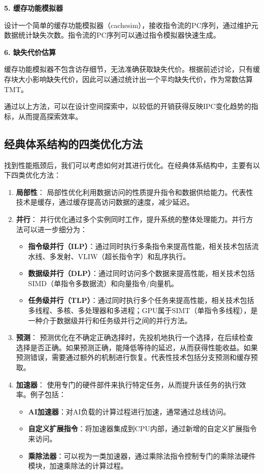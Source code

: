 \textbf{5. 缓存功能模拟器}

设计一个简单的缓存功能模拟器（cachesim），接收指令流的PC序列，通过维护元数据统计缺失次数。指令流的PC序列可以通过指令模拟器快速生成。

\textbf{6. 缺失代价估算}

缓存功能模拟器不包含访存细节，无法准确获取缺失代价。根据前述讨论，只有缓存块大小影响缺失代价，因此可以通过统计出一个平均缺失代价，作为常数估算TMT。

通过以上方法，可以在设计空间探索中，以较低的开销获得反映IPC变化趋势的指标，从而提高探索效率。

\subsection{经典体系结构的四类优化方法}\label{sec:09-cache-031}

找到性能瓶颈后，我们可以考虑如何对其进行优化。在经典体系结构中，主要有以下四类优化方法：

\begin{enumerate}
\def\labelenumi{\arabic{enumi}.}
\tightlist
\item
  \textbf{局部性}： 局部性优化利用数据访问的性质提升指令和数据供给能力。代表性技术是缓存，通过缓存提高访问数据的速度，减少延迟。
\item
  \textbf{并行}： 并行优化通过多个实例同时工作，提升系统的整体处理能力。并行方法可以进一步细分为：

  \begin{itemize}
  \tightlist
  \item
    \textbf{指令级并行（ILP）}：通过同时执行多条指令来提高性能，相关技术包括流水线、多发射、VLIW（超长指令字）和乱序执行。
  \item
    \textbf{数据级并行（DLP）}：通过同时访问多个数据来提高性能，相关技术包括SIMD（单指令多数据流）和向量指令/向量机。
  \item
    \textbf{任务级并行（TLP）}：通过同时执行多个任务来提高性能，相关技术包括多线程、多核、多处理器和多进程；GPU属于SIMT（单指令多线程），是一种介于数据级并行和任务级并行之间的并行方法。
  \end{itemize}
\item
  \textbf{预测}： 预测优化在不确定正确选择时，先投机地执行一个选择，在后续检查选择是否正确。如果预测正确，能降低等待的延迟，从而获得性能收益。如果预测错误，需要通过额外的机制进行恢复。代表性技术包括分支预测和缓存预取。
\item
  \textbf{加速器}： 使用专门的硬件部件来执行特定任务，从而提升该任务的执行效率。例子包括：

  \begin{itemize}
  \tightlist
  \item
    \textbf{AI加速器}：对AI负载的计算过程进行加速，通常通过总线访问。
  \item
    \textbf{自定义扩展指令}：将加速器集成到CPU内部，通过新增的自定义扩展指令来访问。
  \item
    \textbf{乘除法器}：可以视为一类加速器，通过乘除法指令控制专门的乘除法硬件模块，加速乘除法的计算过程。
  \end{itemize}
\end{enumerate}
